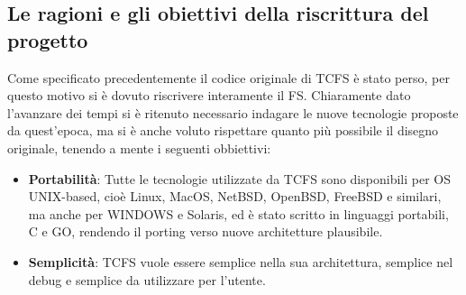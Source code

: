 \subsection{Le ragioni e gli obiettivi della riscrittura del progetto} 
Come specificato precedentemente il codice originale di TCFS è stato perso, per questo motivo si è dovuto riscrivere interamente il FS. Chiaramente dato l'avanzare dei tempi si è ritenuto necessario indagare le nuove tecnologie proposte da quest'epoca, ma si è anche voluto rispettare quanto più possibile il disegno originale, tenendo a mente i seguenti obbiettivi:
\begin{itemize}
    \item \textbf{Portabilità}: Tutte le tecnologie utilizzate da TCFS sono disponibili per OS UNIX-based, cioè Linux, MacOS, NetBSD, OpenBSD, FreeBSD e similari, ma anche per WINDOWS e Solaris, ed è stato scritto in linguaggi portabili, C e GO, rendendo il porting verso nuove architetture plausibile.
    \item \textbf{Semplicità}: TCFS vuole essere semplice nella sua architettura, semplice nel debug e semplice da utilizzare per l'utente.

\end{itemize}
